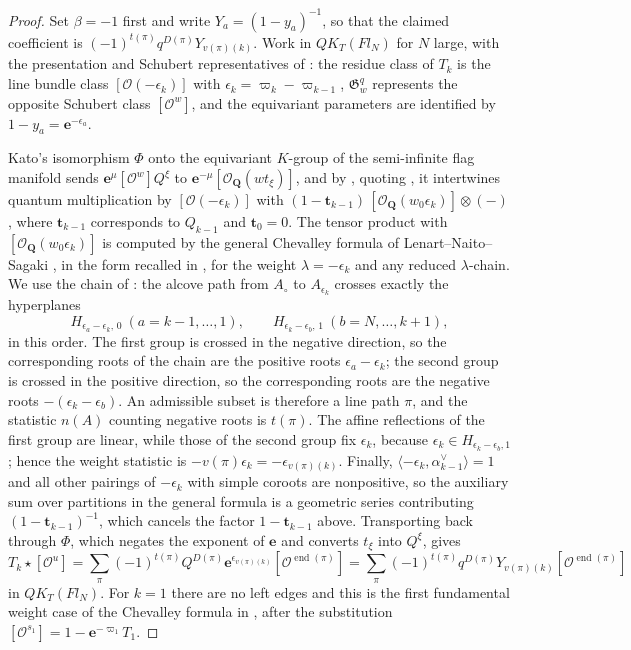 \documentclass[11pt]{article}
\newcommand{\G}{\mathfrak{G}}
\begin{document}
\begin{proof}
Set $\beta=-1$ first and write $Y_a=(1-y_a)^{-1}$, so that the
claimed coefficient is $(-1)^{t(\pi)}q^{D(\pi)}Y_{v(\pi)(k)}$.
Work in $QK_T(Fl_N)$ for $N$ large, with the presentation and
Schubert representatives of \cite{maeno2024presentation2}: the residue class of $T_k$ is
the line bundle class $[\mathcal O(-\epsilon_k)]$ with
$\epsilon_k=\varpi_k-\varpi_{k-1}$, $\G_w^q$ represents the opposite
Schubert class $[\mathcal O^w]$, and the equivariant parameters are
identified by $1-y_a=\mathbf e^{-\epsilon_a}$.

Kato's isomorphism $\Phi$ onto the equivariant $K$-group of the
semi-infinite flag manifold sends $\mathbf e^{\mu}[\mathcal O^w]Q^\xi$
to $\mathbf e^{-\mu}[\mathcal O_{\mathbf Q}(wt_\xi)]$, and by
\cite[Section~3.1]{maeno2024presentation2}, quoting \cite[Proposition~5.2]{maeno2023presentation1}, it
intertwines quantum multiplication by $[\mathcal O(-\epsilon_k)]$ with
$(1-\mathbf t_{k-1})\,[\mathcal O_{\mathbf Q}(w_0\epsilon_k)]\otimes(-)$,
where $\mathbf t_{k-1}$ corresponds to $Q_{k-1}$ and $\mathbf t_0=0$.
The tensor product with $[\mathcal O_{\mathbf Q}(w_0\epsilon_k)]$ is
computed by the general Chevalley formula of Lenart--Naito--Sagaki
\cite[Theorem~33]{lenart2024chevalley}, in the form recalled in
\cite[Section~5.1]{maeno2024presentation2}, for the weight $\lambda=-\epsilon_k$ and
any reduced $\lambda$-chain. We use the chain of
\cite[Section~5.2]{maeno2024presentation2}: the alcove path from $A_\circ$ to
$A_{\epsilon_k}$ crosses exactly the hyperplanes
\[
 H_{\epsilon_a-\epsilon_k,\,0}\ (a=k-1,\ldots,1),\qquad
 H_{\epsilon_k-\epsilon_b,\,1}\ (b=N,\ldots,k+1),
\]
in this order. The first group is crossed in the negative direction,
so the corresponding roots of the chain are the positive roots
$\epsilon_a-\epsilon_k$; the second group is crossed in the positive
direction, so the corresponding roots are the negative roots
$-(\epsilon_k-\epsilon_b)$. An admissible subset is therefore a line
path $\pi$, and the statistic $n(A)$ counting negative roots is
$t(\pi)$. The affine reflections of the first group are linear, while
those of the second group fix $\epsilon_k$, because
$\epsilon_k\in H_{\epsilon_k-\epsilon_b,1}$; hence the weight
statistic is $-v(\pi)\epsilon_k=-\epsilon_{v(\pi)(k)}$. Finally,
$\langle-\epsilon_k,\alpha_{k-1}^\vee\rangle=1$ and all other pairings
of $-\epsilon_k$ with simple coroots are nonpositive, so the auxiliary
sum over partitions in the general formula is a geometric series
contributing $(1-\mathbf t_{k-1})^{-1}$, which cancels the factor
$1-\mathbf t_{k-1}$ above. Transporting back through $\Phi$, which
negates the exponent of $\mathbf e$ and converts $t_\xi$ into
$Q^\xi$, gives
\[
 T_k\star[\mathcal O^u]
 =\sum_\pi(-1)^{t(\pi)}Q^{D(\pi)}\mathbf e^{\epsilon_{v(\pi)(k)}}
       [\mathcal O^{\operatorname{end}(\pi)}]
 =\sum_\pi(-1)^{t(\pi)}q^{D(\pi)}Y_{v(\pi)(k)}
       [\mathcal O^{\operatorname{end}(\pi)}]
\]
in $QK_T(Fl_N)$. For $k=1$ there are no left edges and this is the
first fundamental weight case of the Chevalley formula in
\cite[Section~5]{lenart2024chevalley}, after the substitution
$[\mathcal O^{s_1}]=1-\mathbf e^{-\varpi_1}T_1$.


\end{proof}
\end{document}

